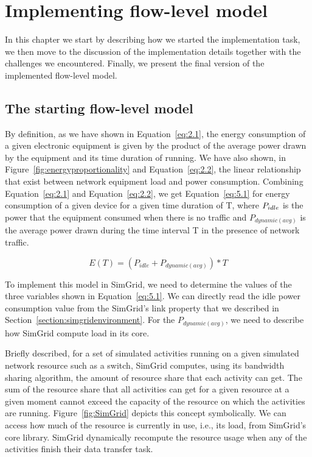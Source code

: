 \chapter{Implementing flow-level model}
\label{chapter:implementation}

In this chapter we start by describing how we started the implementation task, we then move to the discussion of the implementation details together with the challenges we encountered. Finally, we present the final version of the implemented flow-level model. 
\section{The starting flow-level model}
By definition, as we have shown in Equation~\ref{eq:2.1}, the energy consumption of a given electronic equipment is given by the product of the average power drawn by the equipment and its time duration of running. We have also shown, in Figure~\ref{fig:energyproportionality} and Equation~\ref{eq:2.2}, the linear relationship that exist between network equipment load and power consumption. Combining Equation~\ref{eq:2.1} and Equation~\ref{eq:2.2}, we get  Equation~\ref{eq:5.1} for energy consumption of a given device for a given time duration of T, where \($$P_{idle}$$\) is the power that the equipment consumed when there is no traffic and \(P_{dynamic (avg)}\) is the average power drawn during the time interval T in the presence of network traffic.

\begin{equation} \label{eq:5.1}
E(T) = (P_{idle} + P_{dynamic (avg)}) * T 
\end{equation} 

To implement this model in SimGrid, we need to determine the values of the three variables shown in Equation~\ref{eq:5.1}. We can directly read the idle power consumption value from the SimGrid's link property that we described in Section~\ref{section:simgridenvironment}. For the \(P_{dynamic (avg)}\), we need to describe how SimGrid compute load in its core. 

Briefly described, for a set of simulated activities running on a given simulated network resource such as a switch, SimGrid computes, using its bandwidth sharing algorithm, the amount of resource share that each activity can get. The sum of the resource share that all activities can get for a given resource at a given moment cannot exceed the capacity of the resource on which the activities are running. Figure~\ref{fig:SimGrid} depicts this concept symbolically. We can access how much of the resource is currently in use, i.e., its load, from SimGrid's core library. SimGrid dynamically recompute the resource usage when any of the activities finish their data transfer task. 

